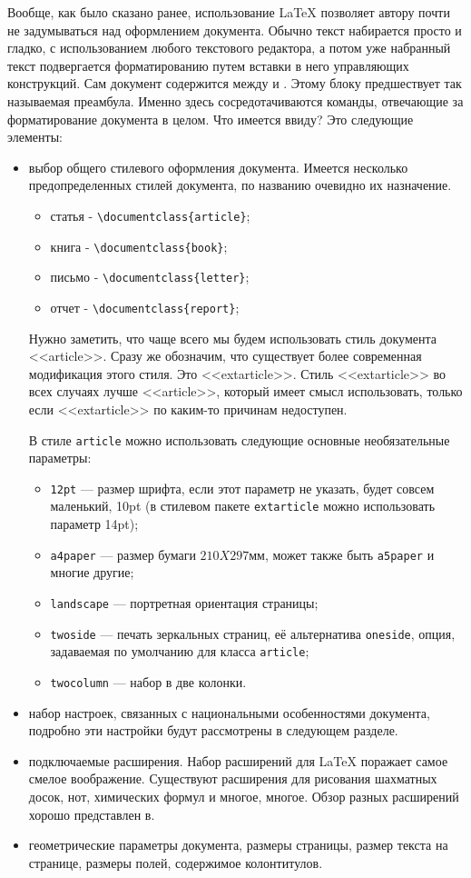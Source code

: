 Вообще, как было сказано ранее, использование \LaTeX{} позволяет автору почти не
задумываться над оформлением документа. Обычно текст набирается просто и гладко, с 
использованием любого текстового редактора, а потом уже набранный текст подвергается
форматированию путем вставки в него управляющих конструкций.
Сам документ содержится между \verb|| и \verb||. Этому 
блоку предшествует так называемая преамбула. Именно здесь сосредотачиваются команды, 
отвечающие за форматирование документа в целом. Что имеется ввиду? Это следующие элементы:
\begin{itemize}
\item выбор общего стилевого оформления документа. 
Имеется несколько предопределенных стилей документа, по названию очевидно их назначение. 
\begin{itemize}
\item статья - \verb|\documentclass{article}|;
\item книга - \verb|\documentclass{book}|;
\item письмо - \verb|\documentclass{letter}|;
\item отчет - \verb|\documentclass{report}|;

\end{itemize}
Нужно заметить, что чаще всего мы будем использовать стиль документа <<article>>. Сразу 
же обозначим, что существует более современная модификация этого стиля. Это <<extarticle>>.
Стиль <<extarticle>> во всех случаях лучше <<article>>, который имеет смысл использовать,
только если <<extarticle>> по каким-то причинам недоступен.

В стиле \verb|article| можно использовать следующие основные необязательные параметры:
\begin{itemize}
\item \verb|12pt| --- размер шрифта, если этот параметр не указать, будет совсем маленький,
10pt (в стилевом пакете \verb|extarticle| можно использовать параметр 14pt);
\item \verb|a4paper| --- размер бумаги $210 X 297$мм, может также быть \verb|a5paper| и
многие другие;
\item \verb|landscape| --- портретная ориентация страницы;
\item \verb|twoside| --- печать зеркальных страниц, её альтернатива \verb|oneside|, 
опция, задаваемая по умолчанию для класса \verb|article|;
\item \verb|twocolumn| --- набор в две колонки.
\end{itemize}
\item набор настроек, связанных с национальными особенностями документа, подробно эти
настройки будут рассмотрены в следующем разделе.
\item подключаемые расширения. 
Набор расширений для \LaTeX{} поражает самое смелое воображение. Существуют расширения 
для рисования шахматных досок, нот, химических формул и многое, многое. Обзор разных
расширений хорошо представлен в.
\item геометрические параметры документа, размеры страницы, размер текста на странице,
размеры полей, содержимое колонтитулов.
\end{itemize}
